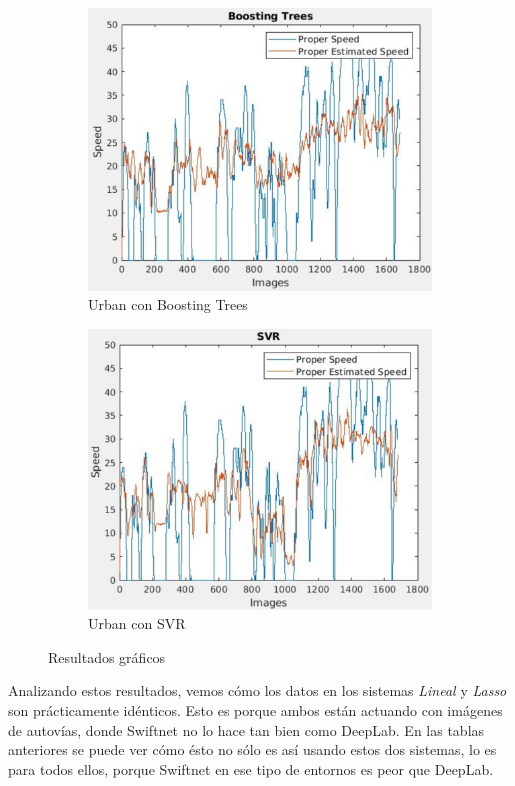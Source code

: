 \begin{figure}[H]
\begin{subfigure}[b]{0.45\linewidth}
    \includegraphics[width=\linewidth]{Figuras/Boosting_Urban(Nivel_1).eps}
    \caption{Urban con Boosting Trees}
  \end{subfigure}
      \begin{subfigure}[b]{0.45\linewidth}
    \includegraphics[width=\linewidth]{Figuras/SVR_Urban(Nivel_1).eps}
    \caption{Urban con SVR}
  \end{subfigure}
  \caption{Resultados gráficos}
\end{figure}

Analizando estos resultados, vemos cómo los datos en los sistemas \textit{Lineal} y \textit{Lasso} son prácticamente idénticos. Esto es porque ambos están actuando con imágenes de autovías, donde Swiftnet no lo hace tan bien como DeepLab. En las tablas anteriores se puede ver cómo ésto no sólo es así usando estos dos sistemas, lo es para todos ellos, porque Swiftnet en ese tipo de entornos es peor que DeepLab.

